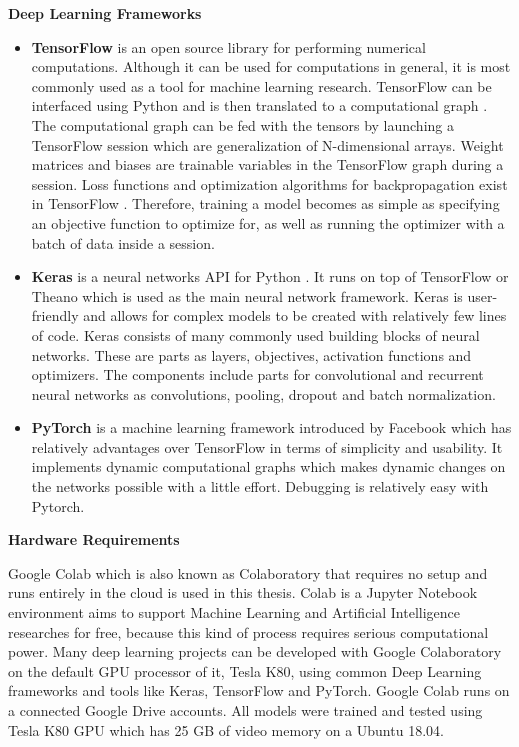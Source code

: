     \textbf{Deep Learning Frameworks}

        \begin{itemize}

            \item \textbf{TensorFlow} is an open source library for performing numerical computations. Although it can be used for computations in general,
                    it is most commonly used as a tool for machine learning research.
                    TensorFlow can be interfaced using Python and is then translated to a computational graph \cite{abadi2015tensorflow}.
                    The computational graph can be fed with the tensors  by launching a TensorFlow session which are generalization of N-dimensional arrays.
                    Weight matrices and biases are trainable variables in the TensorFlow graph during a session.
                    Loss functions and optimization algorithms for backpropagation exist in TensorFlow \cite{johansen2019medical}.
                    Therefore, training a model becomes as simple as specifying an objective function to optimize for, as well as running the optimizer with a batch of data inside a session.

            \item \textbf{Keras} is a neural networks API for Python \cite{chollet2015}. It runs on top of TensorFlow or Theano \cite{mohan2019medical}
                    which is used as the main neural network framework. Keras is user-friendly and allows for complex models to be created with relatively few lines of code.
                    Keras consists of many commonly used building blocks of neural networks. These are parts as layers, objectives, activation functions and optimizers.
                    The components include parts for convolutional and recurrent neural networks as convolutions, pooling, dropout and batch normalization.

            \item \textbf{PyTorch} is a machine learning framework introduced by Facebook which has relatively advantages over TensorFlow
                    in terms of simplicity and usability. It implements dynamic computational graphs which makes dynamic changes
                    on the networks possible with a little effort. Debugging is relatively easy with Pytorch.

        \end{itemize}


    \textbf{Hardware Requirements}

        Google Colab which is also known as Colaboratory that requires no setup and runs entirely in the cloud is used in this thesis.
            Colab is a Jupyter Notebook environment aims to support Machine Learning and Artificial Intelligence researches for free,
            because this kind of process requires serious computational power.
            Many deep learning projects can be developed with Google Colaboratory on the default GPU processor of it, Tesla K80, using common Deep Learning frameworks and tools like Keras,
            TensorFlow and PyTorch. Google Colab runs on a connected Google Drive accounts.
            All models were trained and tested using Tesla K80 GPU which has 25 GB of video memory on a Ubuntu 18.04.

